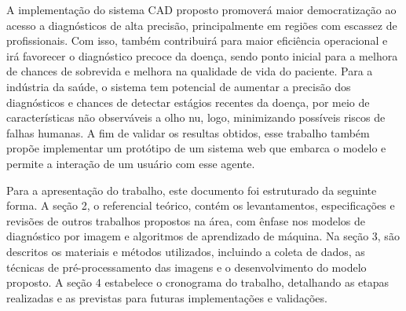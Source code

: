 A implementação do sistema CAD proposto promoverá maior democratização ao acesso a diagnósticos de alta precisão, principalmente em regiões com escassez de profissionais. Com isso, também contribuirá para maior eficiência operacional e irá favorecer o diagnóstico precoce da doença, sendo ponto inicial para a melhora de chances de sobrevida e melhora na qualidade de vida do paciente. Para a indústria da saúde, o sistema tem potencial de aumentar a precisão dos diagnósticos e chances de detectar estágios recentes da doença, por meio de características não observáveis a olho nu, logo, minimizando possíveis riscos de falhas humanas. A fim de validar os resultas obtidos, esse trabalho também propõe implementar um protótipo de um sistema web que embarca o modelo e permite a interação de um usuário com esse agente.

Para a apresentação do trabalho, este documento foi estruturado da seguinte forma.
A seção 2, o referencial teórico, contém os levantamentos, especificações e revisões de outros trabalhos propostos na área, com ênfase nos modelos de diagnóstico por imagem e algoritmos de aprendizado de máquina. Na seção 3, são descritos os materiais e métodos utilizados, incluindo a coleta de dados, as técnicas de pré-processamento das imagens e o desenvolvimento do modelo proposto. A seção 4 estabelece o cronograma do trabalho, detalhando as etapas realizadas e as previstas para futuras implementações e validações.
